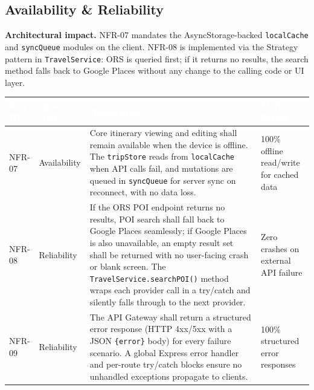 \documentclass[12pt, a4paper]{article}
\newcommand{\reqid}[1]{\textsc{\small #1}}
\newcommand{\thcell}[1]{\textcolor{white}{\textbf{\small #1}}}
\begin{document}
\subsection{Availability \& Reliability}

\begin{tcolorbox}[notebox]
  \textbf{Architectural impact.} NFR-07 mandates the AsyncStorage-backed \texttt{localCache} and \texttt{syncQueue} modules on the client. NFR-08 is implemented via the Strategy pattern in \texttt{TravelService}: ORS is queried first; if it returns no results, the search method falls back to Google Places without any change to the calling code or UI layer.
\end{tcolorbox}

\vspace{0.4em}
\begin{longtable}{C{1.5cm} C{2.4cm} L{7.0cm} C{2.7cm}}
\toprule
{}
\thcell{Req ID} & \thcell{Quality Attr.} & \thcell{Requirement} & \thcell{Metric / Target} \\
\midrule
\endhead
\bottomrule
\endfoot

\reqid{NFR-07} & Availability &
Core itinerary viewing and editing shall remain available when the device is offline. The \texttt{tripStore} reads from \texttt{localCache} when API calls fail, and mutations are queued in \texttt{syncQueue} for server sync on reconnect, with no data loss. &
100\% offline read/write for cached data \\

\reqid{NFR-08} & Reliability &
If the ORS POI endpoint returns no results, POI search shall fall back to Google Places seamlessly; if Google Places is also unavailable, an empty result set shall be returned with no user-facing crash or blank screen. The \texttt{TravelService.searchPOI()} method wraps each provider call in a try/catch and silently falls through to the next provider. &
Zero crashes on external API failure \\

\reqid{NFR-09} & Reliability &
The API Gateway shall return a structured error response (HTTP 4xx/5xx with a JSON \texttt{\{error\}} body) for every failure scenario. A global Express error handler and per-route try/catch blocks ensure no unhandled exceptions propagate to clients. &
100\% structured error responses \\

\end{longtable}
\end{document}
